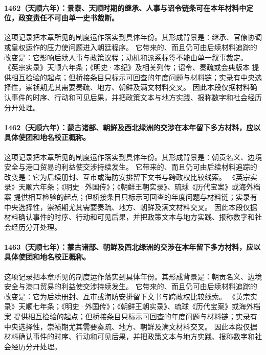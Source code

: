 \paragraph{1462（天顺六年）：景泰、天顺时期的继承、人事与诏令链条可在本年材料中定位，政变责任不可由单一史书裁断。} 这项记录把本章所见的制度运作落实到具体年份。其形成背景是：继承、官僚协调或皇权运作的压力使问题进入朝廷程序。 它带来的、而且仍可由后续材料追踪的改变是：它影响后续人事与政策议程；动机和派系标签不能由单一叙事裁定。 《英宗实录》天顺六年条；《明史·本纪》及相关列传；诏令、奏疏或会典版本 提供相互检验的起点；但桥接条目只标示可回查的年度问题与材料链；实录有中央选择性，崇祯期尤其需要奏疏、地方、朝鲜及满文材料交叉。 因此本段仅据材料确认事件的时序、行动和可见后果，并把政策文本与地方实践、报称数字和社会经历分开处理。

\paragraph{1462（天顺六年）：蒙古诸部、朝鲜及西北绿洲的交涉在本年留下多方材料，应以具体使团和地名校正概称。} 这项记录把本章所见的制度运作落实到具体年份。其形成背景是：朝贡名义、边境安全与港口贸易的利益使交涉持续发生。 它带来的、而且仍可由后续材料追踪的改变是：它为后续册封、互市或海防安排留下文书与跨政权比较线索。 《英宗实录》天顺六年条；《明史·外国传》；《朝鲜王朝实录》、琉球《历代宝案》或海外档案 提供相互检验的起点；但桥接条目只标示可回查的年度问题与材料链；实录有中央选择性，崇祯期尤其需要奏疏、地方、朝鲜及满文材料交叉。 因此本段仅据材料确认事件的时序、行动和可见后果，并把政策文本与地方实践、报称数字和社会经历分开处理。

\paragraph{1463（天顺七年）：蒙古诸部、朝鲜及西北绿洲的交涉在本年留下多方材料，应以具体使团和地名校正概称。} 这项记录把本章所见的制度运作落实到具体年份。其形成背景是：朝贡名义、边境安全与港口贸易的利益使交涉持续发生。 它带来的、而且仍可由后续材料追踪的改变是：它为后续册封、互市或海防安排留下文书与跨政权比较线索。 《英宗实录》天顺七年条；《明史·外国传》；《朝鲜王朝实录》、琉球《历代宝案》或海外档案 提供相互检验的起点；但桥接条目只标示可回查的年度问题与材料链；实录有中央选择性，崇祯期尤其需要奏疏、地方、朝鲜及满文材料交叉。 因此本段仅据材料确认事件的时序、行动和可见后果，并把政策文本与地方实践、报称数字和社会经历分开处理。

